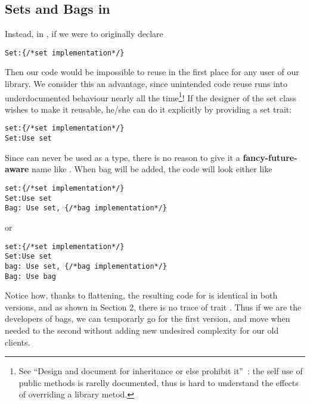 \subsection{Sets and Bags in \name}
Instead, in \name, if we were to originally declare
\saveSpace\begin{lstlisting}
Set:{/*set implementation*/} 
\end{lstlisting}\saveSpace
Then our code would be impossible to reuse in the first place for any user of our library.
We consider this an advantage, since unintended code reuse runs into underdocumented behaviour nearly all the time\footnote{See
``Design and document for inheritance or else prohibit
it''~\cite{Bloch08}: the
self use of public methods is rarelly documented, thus is hard to understand the effects of overriding a library metod.
}!
If the designer of the set class wishes to make it reusable, he/she can do it explicitly by providing a set trait:
\saveSpace\begin{lstlisting}
set:{/*set implementation*/} 
Set:Use set
\end{lstlisting}\saveSpace
Since \Q@set@ can never be used as a type, there is no reason to give it a {\bf fancy-future-aware} name like
\Q@AbstractSetOrBag@.
When bag will be added, the code will look either like
\saveSpace\begin{lstlisting}
set:{/*set implementation*/} 
Set:Use set
Bag: Use set, {/*bag implementation*/}
\end{lstlisting}\saveSpace\saveSpace
or 
\saveSpace\saveSpace\begin{lstlisting}
set:{/*set implementation*/} 
Set:Use set
bag: Use set, {/*bag implementation*/}
Bag: Use bag
\end{lstlisting}\saveSpace
Notice how, thanks to flattening, the resulting code for \Q@Bag@ is identical in both versions, 
and as shown in Section 2, there is no trace of trait \Q@bag@. Thus if we are the developers of bags, we can temporarly go for the first version, and move when needed to the second without adding new undesired complexity for our old clients. 



